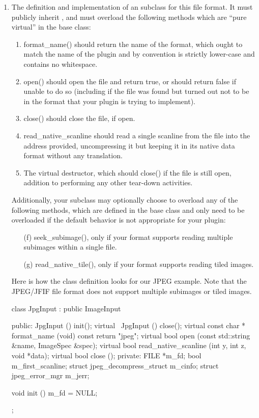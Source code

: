 \begin{enumerate}
\item The definition and implementation of an \ImageInput subclass for
  this file format.  It must publicly inherit \ImageInput, and must
  overload the following methods which are ``pure virtual'' in the
  \ImageInput base class:

  \begin{enumerate}
    \item {\cf format_name()} should return the name of the format, which
      ought to match the name of the plugin and by convention is
      strictly lower-case and contains no whitespace.
    \item {\cf open()} should open the file and return true, or should
      return false if unable to do so (including if the file was found
      but turned out not to be in the format that your plugin is trying
      to implement).
    \item {\cf close()} should close the file, if open.
    \item {\cf read_native_scanline} should read a single scanline from
      the file into the address provided, uncompressing it but
      keeping it in its native data format without any translation.
    \item The virtual destructor, which should {\cf close()} if the file
      is still open, addition to performing any other tear-down activities.
  \end{enumerate}
  
  Additionally, your \ImageInput subclass may optionally choose to
  overload any of the following methods, which are defined in the
  \ImageInput base class and only need to be overloaded if the default
  behavior is not appropriate for your plugin:

  \begin{enumerate}
    \item[(f)] {\cf seek_subimage()}, only if your format supports
      reading multiple subimages within a single file.
    \item[(g)] {\cf read_native_tile()}, only if your format supports
      reading tiled images.
  \end{enumerate}

  Here is how the class definition looks for our JPEG example.  Note
  that the JPEG/JFIF file format does not support multiple subimages
  or tiled images.

  \begin{code}
    class JpgInput : public ImageInput {
     public:
        JpgInput () { init(); }
        virtual ~JpgInput () { close(); }
        virtual const char * format_name (void) const { return "jpeg"; }
        virtual bool open (const std::string &name, ImageSpec &spec);
        virtual bool read_native_scanline (int y, int z, void *data);
        virtual bool close ();
     private:
        FILE *m_fd;
        bool m_first_scanline;
        struct jpeg_decompress_struct m_cinfo;
        struct jpeg_error_mgr m_jerr;

        void init () { m_fd = NULL; }
    };
  \end{code}
\end{enumerate}

